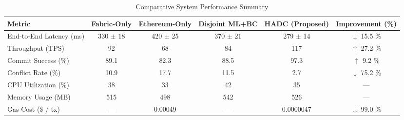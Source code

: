 

\begin{table}[htbp]
\centering
\caption{Comparative System Performance Summary}
\label{tab:performance_summary}
\begin{tabular}{lccccc}
\toprule
\textbf{Metric} & \textbf{Fabric-Only} & \textbf{Ethereum-Only} & \textbf{Disjoint ML+BC} & \textbf{HADC (Proposed)} & \textbf{Improvement (\%)} \\
\midrule
End-to-End Latency (ms) & 330 $\pm$ 18 & 420 $\pm$ 25 & 370 $\pm$ 21 & 279 $\pm$ 14 & $\downarrow$ 15.5 \% \\
Throughput (TPS) & 92 & 68 & 84 & 117 & $\uparrow$ 27.2 \% \\
Commit Success (\%) & 89.1 & 82.3 & 88.5 & 97.3 & $\uparrow$ 9.2 \% \\
Conflict Rate (\%) & 10.9 & 17.7 & 11.5 & 2.7 & $\downarrow$ 75.2 \% \\
CPU Utilization (\%) & 38 & 33 & 42 & 35 & --- \\
Memory Usage (MB) & 515 & 498 & 542 & 526 & --- \\
Gas Cost (\$ / tx) & --- & 0.00049 & --- & 0.0000047 & $\downarrow$ 99.0 \% \\
\bottomrule
\end{tabular}
\end{table}



